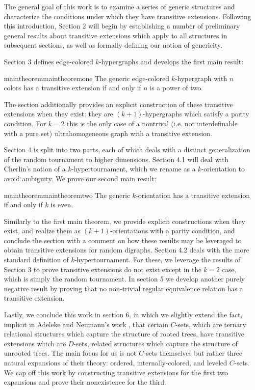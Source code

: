 \documentclass{amsart}
\begin{document}
The general goal of this work is to examine a series of generic structures and characterize the conditions under which they have transitive extensions. Following this introduction, Section 2 will begin by establishing a number of preliminary general results about transitive extensions which apply to all structures in subsequent sections, as well as formally defining our notion of genericity.

Section 3 defines edge-colored $k$-hypergraphs and develops the first main result:

\begin{restatable}{maintheorem}{maintheoremone}\label{main graph theorem}
    The generic edge-colored $k$-hypergraph with $n$ colors has a transitive extension if and only if $n$ is a power of two.
\end{restatable}

The section additionally provides an explicit construction of these transitive extensions when they exist: they are $(k+1)$-hypergraphs which satisfy a parity condition. For $k=2$ this is the only case of a nontrival (i.e. not interdefinable with a pure set) ultrahomogeneous graph with a transitive extension.

Section 4 is split into two parts, each of which deals with a distinct generalization of the random tournament to higher dimensions. Section 4.1 will deal with Cherlin's notion of a $k$-hypertournament, which we rename as a $k$-orientation to avoid ambiguity. We prove our second main result:

\begin{restatable}{maintheorem}{maintheoremtwo}\label{main orient theorem}
    The generic $k$-orientation has a transitive extension if and only if $k$ is even.
\end{restatable}

Similarly to the first main theorem, we provide explicit constructions when they exist, and realize them as $(k+1)$-orientations with a parity condition, and conclude the section with a comment on how these results may be leveraged to obtain transitive extensions for random digraphs. Section 4.2 deals with the more standard definition of $k$-hypertournament. For these, we leverage the results of Section 3 to prove transitive extensions do not exist except in the $k = 2$ case, which is simply the random tournament. In section 5 we develop another purely negative result by proving that no non-trivial regular equivalence relation has a transitive extension. 

Lastly, we conclude this work in section 6, in which we slightly extend the fact, implicit in Adeleke and Neumann's work \cite{adeleke1998relations}, that certain $C$-sets, which are ternary relational structures which capture the structure of rooted trees, have transitive extensions which are $D$-sets, related structures which capture the structure of unrooted trees. The main focus for us is not $C$-sets themselves but rather three natural expansions of their theory: ordered, internally-colored, and leveled $C$-sets. We cap off this work by constructing transitive extensions for the first two expansions and prove their nonexistence for the third.
\end{document}
